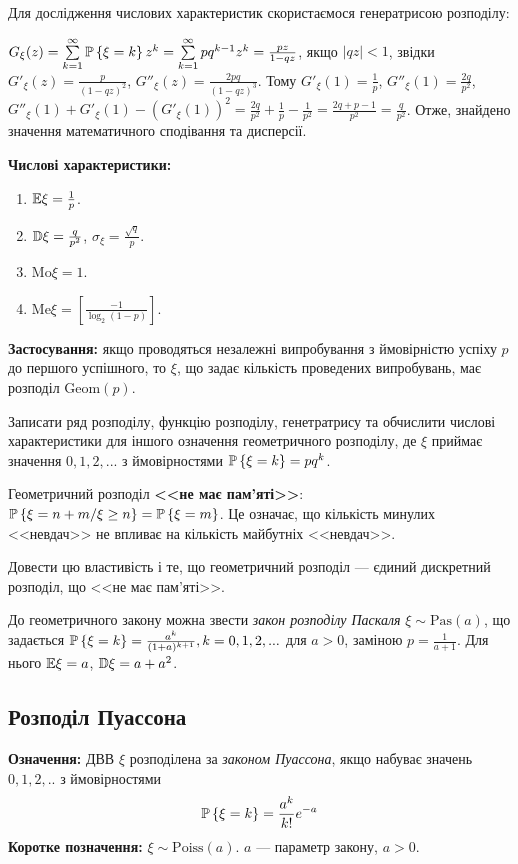 Для дослідження числових характеристик скористаємося генератрисою розподілу:

$G_\xi(z) = \sum\limits_{k=1}^{\infty} \P\left\{\xi = k\right\} z^k = \sum\limits_{k=1}^{\infty} pq^{k-1} z^k = \frac{pz}{1-qz}$, якщо $\left| qz\right|<1$, звідки
$G'_\xi(z) = \frac{p}{(1-qz)^2}$, $G''_\xi(z) = \frac{2pq}{(1-qz)^3}$. Тому
$G'_\xi(1) = \frac{1}{p}$, $G''_\xi(1) = \frac{2q}{p^2}$, $G''_\xi(1) + G'_\xi(1) - \left( G'_\xi(1)\right)^2 = \frac{2q}{p^2} + \frac{1}{p} - \frac{1}{p^2} = \frac{2q+p-1}{p^2} = \frac{q}{p^2}$.
Отже, знайдено значення математичного сподівання та дисперсії.

\noindent\textbf{Числові характеристики:}
\begin{enumerate}
    \item $\E\xi = \frac{1}{p}$.
    \item $\D\xi = \frac{q}{p^2}$, $\sigma_\xi = \frac{\sqrt{q}}{p}$.
    \item $\mathrm{Mo}\xi = 1$.
    \item $\mathrm{Me}\xi = \left[ \frac{-1}{\log_2(1-p)}\right]$.
\end{enumerate}

\noindent\textbf{Застосування:} якщо проводяться незалежні випробування з ймовірністю успіху $p$ до першого успішного,
    то $\xi$, що задає кількість проведених випробувань, має розподіл $\mathrm{Geom}(p)$.

\begin{exercise}
    Записати ряд розподілу, функцію розподілу, генетратрису та обчислити
    числові характеристики для іншого означення геометричного розподілу, 
    де $\xi$ приймає значення $0,1,2,...$ з ймовірностями $\P\left\{\xi = k\right\} = pq^k$.
\end{exercise}
Геометричний розподіл \textbf{<<не має пам'яті>>}: $\P\left\{\xi = n+m / \xi \geq n\right\} = \P\left\{\xi = m\right\}$.
Це означає, що кількість минулих <<невдач>> не впливає на кількість майбутніх <<невдач>>.
\begin{exercise}
    Довести цю властивість і те, що геометричний розподіл --- 
    єдиний дискретний розподіл, що <<не має пам'яті>>.
\end{exercise}
До геометричного закону можна звести \emph{закон розподілу Паскаля} $\xi \sim \mathrm{Pas}(a)$,
що задається $\P\left\{\xi = k\right\} = \frac{a^k}{(1+a)^{k+1}}, k = 0,1,2,...$ для $a>0$,
заміною $p=\frac{1}{a+1}$. Для нього $\E\xi = a$, $\D\xi = a + a^2$.

\subsection{Розподіл Пуассона}
\noindent\textbf{Означення:}
    ДВВ $\xi$ розподілена за \emph{законом Пуассона}, 
    якщо набуває значень $0,1,2,..$ з ймовірностями \begin{equation}
        \P\left\{\xi = k\right\} = \frac{a^k}{k!}e^{-a}
    \end{equation}
    \textbf{Коротке позначення:} $\xi \sim \mathrm{Poiss}(a)$.
    $a$ --- параметр закону, $a > 0$.

